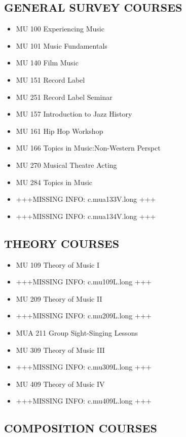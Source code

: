 \documentclass[
  letterpaper,
]{scrbook}
\providecommand{\tightlist}{%
  \setlength{\itemsep}{0pt}\setlength{\parskip}{0pt}}
\begin{document}
\subsection{GENERAL SURVEY COURSES}\label{general-survey-courses}

\begin{itemize}
\tightlist
\item
  MU 100 Experiencing Music
\item
  MU 101 Music Fundamentals
\item
  MU 140 Film Music
\item
  MU 151 Record Label
\item
  MU 251 Record Label Seminar
\item
  MU 157 Introduction to Jazz History
\item
  MU 161 Hip Hop Workshop
\item
  MU 166 Topics in Music:Non-Western Perspct
\item
  MU 270 Musical Theatre Acting
\item
  MU 284 Topics in Music
\item
  +++MISSING INFO: c.mua133V.long +++
\item
  +++MISSING INFO: c.mua134V.long +++
\end{itemize}

\subsection{THEORY COURSES}\label{theory-courses}

\begin{itemize}
\tightlist
\item
  MU 109 Theory of Music I
\item
  +++MISSING INFO: c.mu109L.long +++
\item
  MU 209 Theory of Music II
\item
  +++MISSING INFO: c.mu209L.long +++
\item
  MUA 211 Group Sight-Singing Lessons
\item
  MU 309 Theory of Music III
\item
  +++MISSING INFO: c.mu309L.long +++
\item
  MU 409 Theory of Music IV
\item
  +++MISSING INFO: c.mu409L.long +++
\end{itemize}

\subsection{COMPOSITION COURSES}\label{composition-courses}
\end{document}
